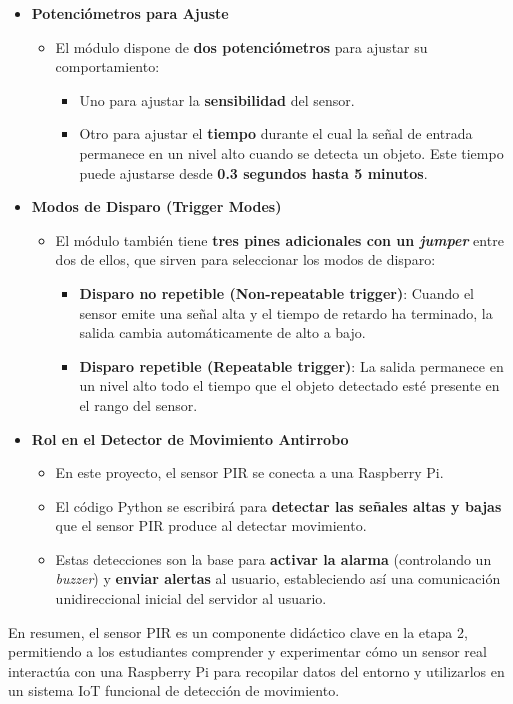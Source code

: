 \documentclass{report}
\begin{document}
\begin{itemize}
    \item \textbf{Potenciómetros para Ajuste}
    \begin{itemize}
        \item El módulo dispone de \textbf{dos potenciómetros} para ajustar su comportamiento:
        \begin{itemize}
            \item Uno para ajustar la \textbf{sensibilidad} del sensor.
            \item Otro para ajustar el \textbf{tiempo} durante el cual la señal de entrada permanece en un nivel alto cuando se detecta un objeto. Este 
            tiempo puede ajustarse desde \textbf{0.3 segundos hasta 5 minutos}.
        \end{itemize}
    \end{itemize}

    \item \textbf{Modos de Disparo (Trigger Modes)}
    \begin{itemize}
        \item El módulo también tiene \textbf{tres pines adicionales con un \textit{jumper}} entre dos de ellos, que sirven para seleccionar los modos de 
        disparo:
        \begin{itemize}
            \item \textbf{Disparo no repetible (Non-repeatable trigger)}: Cuando el sensor emite una señal alta y el tiempo de retardo ha terminado, la 
            salida cambia automáticamente de alto a bajo.
            \item \textbf{Disparo repetible (Repeatable trigger)}: La salida permanece en un nivel alto todo el tiempo que el objeto detectado esté presente 
            en el rango del sensor.
        \end{itemize}
    \end{itemize}

    \item \textbf{Rol en el Detector de Movimiento Antirrobo}
    \begin{itemize}
        \item En este proyecto, el sensor PIR se conecta a una Raspberry Pi.
        \item El código Python se escribirá para \textbf{detectar las señales altas y bajas} que el sensor PIR produce al detectar movimiento.
        \item Estas detecciones son la base para \textbf{activar la alarma} (controlando un \textit{buzzer}) y \textbf{enviar alertas} al usuario, 
        estableciendo así una comunicación unidireccional inicial del servidor al usuario.
    \end{itemize}
\end{itemize}
En resumen, el sensor PIR es un componente didáctico clave en la etapa 2, permitiendo a los estudiantes comprender y experimentar cómo un sensor 
real interactúa con una Raspberry Pi para recopilar datos del entorno y utilizarlos en un sistema IoT funcional de detección de movimiento.
\end{document}
